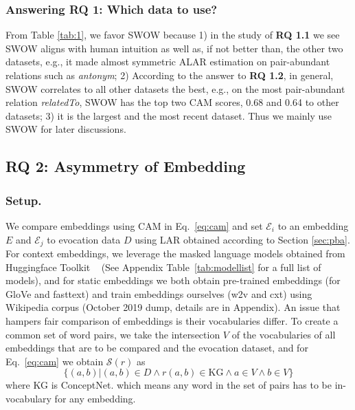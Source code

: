 \documentclass[letterpaper]{article} %
\begin{document}
\subsubsection{Answering RQ 1: Which data to use?} From Table \ref{tab:1}, we favor SWOW because 1) in the study of \textbf{RQ 1.1} we see SWOW aligns with human intuition as well as, if not better than, the other two datasets, e.g., it made almost symmetric ALAR estimation on pair-abundant relations such as  \textit{antonym}; 2) According to the answer to \textbf{RQ 1.2}, in general, SWOW correlates to all other datasets the best, e.g., on the most pair-abundant relation \textit{relatedTo}, SWOW has the top two CAM scores, 0.68 and 0.64 to other datasets; 3) it is the largest and the most recent dataset. Thus we mainly use SWOW for later discussions.




\subsection{\textbf{RQ 2}: Asymmetry of Embedding} 
\subsubsection{Setup.} We compare embeddings using CAM in Eq.~\ref{eq:cam} and set $\mathcal{E}_i$ to an embedding $E$ and $\mathcal{E}_j$ to evocation data $D$ using LAR obtained according to Section \ref{sec:pba}. For context embeddings, we leverage the masked language models obtained from Huggingface Toolkit ~\citep{Wolf2019HuggingFacesTS} (See Appendix Table~\ref{tab:modellist} for a full list of models), and for static embeddings we both obtain pre-trained embeddings (for GloVe and fasttext) and train embeddings ourselves (w2v and cxt) using Wikipedia corpus (October 2019 dump, details are in Appendix). An issue that hampers fair comparison of embeddings is their vocabularies differ. To create a common set of word pairs, we take the intersection $V$ of the vocabularies of all embeddings that are to be compared and the evocation dataset, and for Eq.~\ref{eq:cam} we obtain $\mathcal{S}(r)$ as
\begin{equation}
\label{eq:common_pairs}
 \{(a,b) | (a,b) \in D \wedge r(a,b)\in \text{KG} \wedge a\in V \wedge b\in V\} 
\end{equation}
where KG is ConceptNet. which means any word in the set of pairs has to be in-vocabulary for any embedding. 
\end{document}
